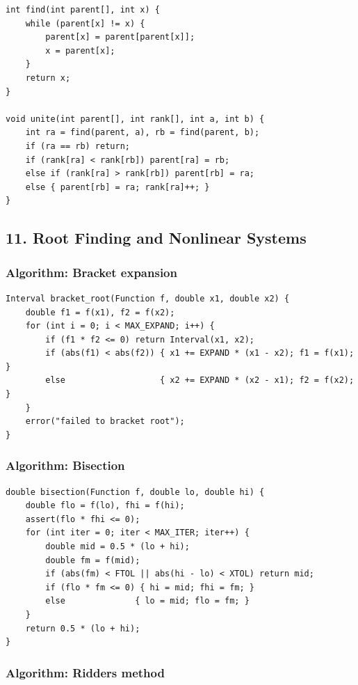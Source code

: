 \documentclass[11pt]{article}
\begin{document}
\begin{verbatim}
int find(int parent[], int x) {
    while (parent[x] != x) {
        parent[x] = parent[parent[x]];
        x = parent[x];
    }
    return x;
}

void unite(int parent[], int rank[], int a, int b) {
    int ra = find(parent, a), rb = find(parent, b);
    if (ra == rb) return;
    if (rank[ra] < rank[rb]) parent[ra] = rb;
    else if (rank[ra] > rank[rb]) parent[rb] = ra;
    else { parent[rb] = ra; rank[ra]++; }
}
\end{verbatim}

\subsection{11. Root Finding and Nonlinear Systems}\label{root-finding-and-nonlinear-systems}

\subsubsection{Algorithm: Bracket expansion}\label{algorithm-bracket-expansion}

\begin{verbatim}
Interval bracket_root(Function f, double x1, double x2) {
    double f1 = f(x1), f2 = f(x2);
    for (int i = 0; i < MAX_EXPAND; i++) {
        if (f1 * f2 <= 0) return Interval(x1, x2);
        if (abs(f1) < abs(f2)) { x1 += EXPAND * (x1 - x2); f1 = f(x1); }
        else                   { x2 += EXPAND * (x2 - x1); f2 = f(x2); }
    }
    error("failed to bracket root");
}
\end{verbatim}

\subsubsection{Algorithm: Bisection}\label{algorithm-bisection}

\begin{verbatim}
double bisection(Function f, double lo, double hi) {
    double flo = f(lo), fhi = f(hi);
    assert(flo * fhi <= 0);
    for (int iter = 0; iter < MAX_ITER; iter++) {
        double mid = 0.5 * (lo + hi);
        double fm = f(mid);
        if (abs(fm) < FTOL || abs(hi - lo) < XTOL) return mid;
        if (flo * fm <= 0) { hi = mid; fhi = fm; }
        else              { lo = mid; flo = fm; }
    }
    return 0.5 * (lo + hi);
}
\end{verbatim}

\subsubsection{Algorithm: Ridders method}\label{algorithm-ridders-method}
\end{document}
